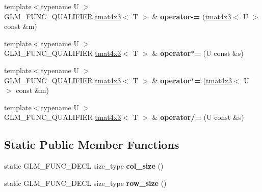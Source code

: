 \begin{DoxyCompactItemize}
\item 
\hypertarget{structglm_1_1detail_1_1tmat4x3_a70944158c7c42121d850a84b74266a84}{}{\footnotesize template$<$typename U $>$ }\\G\+L\+M\+\_\+\+F\+U\+N\+C\+\_\+\+Q\+U\+A\+L\+I\+F\+I\+E\+R \hyperlink{structglm_1_1detail_1_1tmat4x3}{tmat4x3}$<$ T $>$ \& {\bfseries operator-\/=} (\hyperlink{structglm_1_1detail_1_1tmat4x3}{tmat4x3}$<$ U $>$ const \&m)\label{structglm_1_1detail_1_1tmat4x3_a70944158c7c42121d850a84b74266a84}

\item 
\hypertarget{structglm_1_1detail_1_1tmat4x3_a7e1e8035a12bbcce5b1a4b92185ec47a}{}{\footnotesize template$<$typename U $>$ }\\G\+L\+M\+\_\+\+F\+U\+N\+C\+\_\+\+Q\+U\+A\+L\+I\+F\+I\+E\+R \hyperlink{structglm_1_1detail_1_1tmat4x3}{tmat4x3}$<$ T $>$ \& {\bfseries operator$\ast$=} (U const \&s)\label{structglm_1_1detail_1_1tmat4x3_a7e1e8035a12bbcce5b1a4b92185ec47a}

\item 
\hypertarget{structglm_1_1detail_1_1tmat4x3_a572275f4bfe479047ff4429ac26c08e8}{}{\footnotesize template$<$typename U $>$ }\\G\+L\+M\+\_\+\+F\+U\+N\+C\+\_\+\+Q\+U\+A\+L\+I\+F\+I\+E\+R \hyperlink{structglm_1_1detail_1_1tmat4x3}{tmat4x3}$<$ T $>$ \& {\bfseries operator$\ast$=} (\hyperlink{structglm_1_1detail_1_1tmat4x3}{tmat4x3}$<$ U $>$ const \&m)\label{structglm_1_1detail_1_1tmat4x3_a572275f4bfe479047ff4429ac26c08e8}

\item 
\hypertarget{structglm_1_1detail_1_1tmat4x3_a656606e11ae0cb9d0a9cf0c8203604e7}{}{\footnotesize template$<$typename U $>$ }\\G\+L\+M\+\_\+\+F\+U\+N\+C\+\_\+\+Q\+U\+A\+L\+I\+F\+I\+E\+R \hyperlink{structglm_1_1detail_1_1tmat4x3}{tmat4x3}$<$ T $>$ \& {\bfseries operator/=} (U const \&s)\label{structglm_1_1detail_1_1tmat4x3_a656606e11ae0cb9d0a9cf0c8203604e7}

\end{DoxyCompactItemize}
\subsection*{Static Public Member Functions}
\begin{DoxyCompactItemize}
\item 
\hypertarget{structglm_1_1detail_1_1tmat4x3_a4d265b380e0ffcd9c22160ec0aa0174f}{}static G\+L\+M\+\_\+\+F\+U\+N\+C\+\_\+\+D\+E\+C\+L size\+\_\+type {\bfseries col\+\_\+size} ()\label{structglm_1_1detail_1_1tmat4x3_a4d265b380e0ffcd9c22160ec0aa0174f}

\item 
\hypertarget{structglm_1_1detail_1_1tmat4x3_a43233b7dcbaaf896a036ca122d5e084e}{}static G\+L\+M\+\_\+\+F\+U\+N\+C\+\_\+\+D\+E\+C\+L size\+\_\+type {\bfseries row\+\_\+size} ()\label{structglm_1_1detail_1_1tmat4x3_a43233b7dcbaaf896a036ca122d5e084e}

\end{DoxyCompactItemize}
